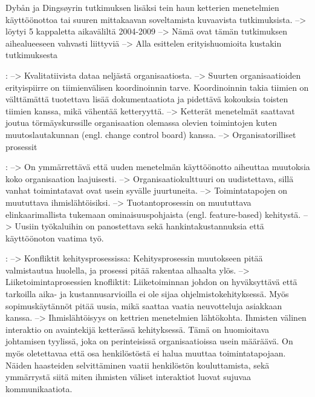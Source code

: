 Dybån ja Dingsøyrin tutkimuksen lisäksi tein haun ketterien menetelmien
käyttöönottoa tai suuren mittakaavan soveltamista kuvaavista tutkimuksista.
--> löytyi 5 kappaletta aikaväliltä 2004-2009
--> Nämä ovat tämän tutkimuksen aihealueeseen vahvasti liittyviä
--> Alla esittelen erityishuomioita kustakin tutkimuksesta

\citep{Lindvall2004}:
--> Kvalitatiivista dataa neljästä organisaatiosta. \newline
--> Suurten organisaatioiden erityispiirre on tiimienvälisen koordinoinnin
tarve. Koordinoinnin takia tiimien on välttämättä tuotettava lisää
dokumentaatiota ja pidettävä kokouksia toisten tiimien kanssa, mikä vähentää
ketteryyttä. \newline
--> Ketterät menetelmät saattavat joutua törmäyskurssille organisaation olemassa
olevien toimintojen kuten muutoslautakunnan (engl. change control board) kanssa. \newline
--> Organisatorilliset prosessit

\citep{Nerur2005}:
--> On ymmärrettävä että uuden menetelmän käyttöönotto aiheuttaa muutoksia koko
organisaation laajuisesti. \newline
--> Organisaatiokulttuuri on uudistettava, sillä vanhat toimintatavat ovat usein
syvälle juurtuneita. \newline
--> Toimintatapojen on muututtava ihmislähtöisiksi. \newline
--> Tuotantoprosessin on muututtava elinkaarimallista tukemaan
ominaisuuspohjaista (engl. feature-based) kehitystä. \newline
--> Uusiin työkaluihin on panostettava sekä hankintakustannuksia että
käyttöönoton vaatima työ.

\citep{Boehm2005}:
--> Konfliktit kehitysprosessissa: Kehitysprosessin muutokseen pitää
valmistautua huolella, ja prosessi pitää rakentaa alhaalta ylös. \newline
--> Liiketoimintaprosessien knofliktit: Liiketoiminnan johdon on hyväksyttävä
että tarkoilla aika- ja kustannusarvioilla ei ole sijaa ohjelmistokehityksessä.
Myös sopimuskäytännöt pitää uusia, mikä saattaa vaatia neuvotteluja asiakkaan
kanssa. \newline
--> Ihmislähtöisyys on kettrien menetelmien lähtökohta. Ihmisten välinen
interaktio on avaintekijä ketterässä kehityksessä. Tämä on huomioitava
johtamisen tyylissä, joka on perinteisissä organisaatioissa usein määräävä. On
myös oletettavaa että osa henkilöstöstä ei halua muuttaa toimintatapojaan.
Näiden haasteiden selvittäminen vaatii henkilöstön kouluttamista, sekä
ymmärrystä siitä miten ihmisten väliset interaktiot luovat sujuvaa
kommunikaatiota.

